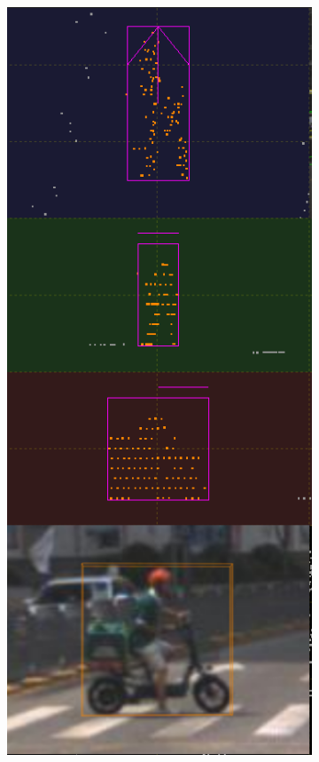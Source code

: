 \documentclass[letterpaper, 10 pt, conference]{ieeeconf}  %
\begin{document}
\begin{figure}[th]
\begin{subfigure}{0.16\linewidth}
		\includegraphics[scale=0.12]{./figures/transfer/rider-5}
		\caption{}
	\end{subfigure}
	

\end{figure}
\end{document}
